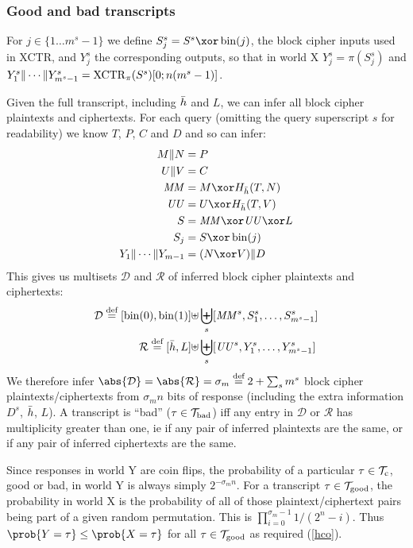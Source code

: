 \documentclass[hctr2.tex]{subfiles}
\begin{document}
\subsubsection{Good and bad transcripts}
For \(j \in \{1 \ldots m^s-1\}\) we define \(S_j^s = S^s \xor \fromint(j)\),
the block cipher inputs used in XCTR, and \(Y_j^s\) the corresponding
outputs, so that in world X \(Y_j^s = \pi(S_j^s)\) and 
\(Y_1^s \Vert \cdots \Vert Y_{m^s-1}^s = \operatorname{XCTR}_\pi(S^s)[0;n(m^s -1)]\).

Given the full transcript, including \(\bar{h}\) and \(L\),
we can infer all block cipher plaintexts and ciphertexts.
For each query
(omitting the query superscript \(s\) for readability)
we know \(T\), \(P\), \(C\) and \(D\) and so can infer:\label{inference}
\begin{align*}
    M \Concat N &= P \\
    U \Concat V &= C \\
    \MM &= M \xor H_{\hgen}(T, N)\\
    \UU &= U \xor H_{\hgen}(T, V)\\
    S &= \MM \xor \UU \xor L\\ 
    S_j &= S \xor \fromint(j)\\
    Y_1 \Concat \cdots \Concat Y_{m-1} &= (N \xor V) \Concat D
\end{align*}
This gives us multisets \(\mathcal{D}\) and \(\mathcal{R}\)
of inferred block cipher plaintexts and ciphertexts:
\begin{align*}
    \mathcal{D} \stackrel{\text{def}}{=} [\operatorname{bin}(0), \operatorname{bin}(1)] \uplus &
    \biguplus_s [\mathit{MM}^s, S_1^s, \ldots, S_{m^s-1}^s]\\
    \mathcal{R} \stackrel{\text{def}}{=} [\bar{h}, L] \uplus &
    \biguplus_s [\mathit{UU}^s, Y_1^s, \ldots, Y_{m^s-1}^s]
\end{align*}
We therefore infer
\(\abs{\mathcal{D}} = \abs{\mathcal{R}} = \sigma_m \defeq 2 + \sum_s m^s\)
block cipher plaintexts/ciphertexts
from \(\sigma_m n\) bits of response
(including the extra information \(D^s\), \(\bar{h}\), \(L\)).
A transcript is ``bad'' (\(\tau \in \mathcal{T}_\mathrm{bad}\))
iff any entry in \(\mathcal{D}\) or \(\mathcal{R}\)
has multiplicity greater than one,
ie if any pair of inferred plaintexts are the same, or
if any pair of inferred ciphertexts are the same.

Since responses in world Y are coin flips,
the probability of a 
particular \(\tau \in \mathcal{T}_\mathrm{c}\), good or bad,
in world Y is always simply \(2^{-\sigma_m n}\).
For a transcript \(\tau \in \mathcal{T}_\mathrm{good}\),
the probability in world X
is the probability of all of those plaintext/ciphertext
pairs being part of a given random permutation.
This is 
\(\prod_{i=0}^{\sigma_m -1}1/(2^n - i)\).
Thus \(\prob{Y = \tau} \leq \prob{X = \tau}\)
for all \(\tau \in \mathcal{T}_\mathrm{good}\) as required (\autoref{hco}).
\end{document}
